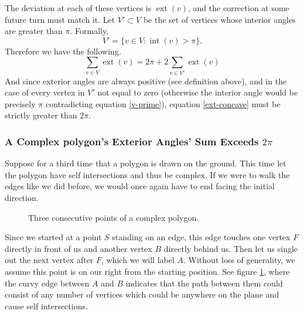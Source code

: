 \documentclass{article}
\newcommand{\vecl}{\overrightarrow} %
\newcommand{\inta}[1]{\operatorname{int}\left( #1 \right)} %
\newcommand{\exta}[1]{\operatorname{ext}\left( #1 \right)} %
\begin{document}
The deviation at each of these vertices is \(\exta{v}\), and the correction at some future turn must match it. Let \(V' \subset V\) be the set of vertices whose interior angles are greater than \(\pi\). Formally,
\begin{equation}
	V' = \{ v \in V : \inta{v} > \pi \}.
	\label{v-prime}
\end{equation}
Therefore we have the following.
\begin{equation}
	\sum_{v \in V} \exta{v} = 2\pi + 2\sum_{v \in V'} \exta{v}
	\label{ext-concave}
\end{equation}
And since exterior angles are always positive (see definition above), and in the case of every vertex in \(V'\) not equal to zero (otherwise the interior angle would be precisely \(\pi\) contradicting equation \ref{v-prime}), equation \ref{ext-concave} must be strictly greater than \(2\pi\).

\subsubsection{A Complex polygon's Exterior Angles' Sum Exceeds \(2\pi\)}

Suppose for a third time that a polygon is drawn on the ground. This time let the polygon have self intersections and thus be complex. If we were to walk the edges like we did before, we would once again have to end facing the initial direction.

\begin{figure}[htbp]
	\centering
	\caption{Three consecutive points of a complex polygon.}
	\label{walk-3}
\end{figure}

Since we started at a point \(S\) standing on an edge, this edge touches one vertex \(F\) directly in front of us and another vertex \(B\) directly behind us. Then let us single out the next vertex after \(F\), which we will label \(A\). Without loss of generality, we assume this point is on our right from the starting position. See figure \ref{walk-3}, where the curvy edge between \(A\) and \(B\) indicates that the path between them could consist of any number of vertices which could be anywhere on the plane and cause self intersections.
\end{document}
